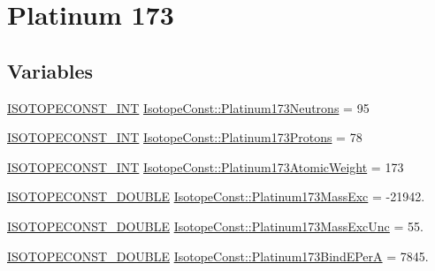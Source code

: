\hypertarget{group___isotope_const-_platinum-_pt173}{}\section{Platinum 173}
\label{group___isotope_const-_platinum-_pt173}
\subsection*{Variables}
\begin{DoxyCompactItemize}
\item 
\mbox{\hyperlink{group___isotope_const-_macros_ga5f18360b3e99483a35c32d789e62621c}{I\+S\+O\+T\+O\+P\+E\+C\+O\+N\+S\+T\+\_\+\+I\+NT}} \mbox{\hyperlink{group___isotope_const-_platinum-_pt173_ga45f5c671c96f5fbc4a76d75455da8bb3}{Isotope\+Const\+::\+Platinum173\+Neutrons}} = 95
\item 
\mbox{\hyperlink{group___isotope_const-_macros_ga5f18360b3e99483a35c32d789e62621c}{I\+S\+O\+T\+O\+P\+E\+C\+O\+N\+S\+T\+\_\+\+I\+NT}} \mbox{\hyperlink{group___isotope_const-_platinum-_pt173_ga7696fb79e86ba0a145583fd72394cceb}{Isotope\+Const\+::\+Platinum173\+Protons}} = 78
\item 
\mbox{\hyperlink{group___isotope_const-_macros_ga5f18360b3e99483a35c32d789e62621c}{I\+S\+O\+T\+O\+P\+E\+C\+O\+N\+S\+T\+\_\+\+I\+NT}} \mbox{\hyperlink{group___isotope_const-_platinum-_pt173_gaa03d9175172927e715d9537d2cde54cd}{Isotope\+Const\+::\+Platinum173\+Atomic\+Weight}} = 173
\item 
\mbox{\hyperlink{group___isotope_const-_macros_ga8f45a7272ce02c0b4c65c44636ed719a}{I\+S\+O\+T\+O\+P\+E\+C\+O\+N\+S\+T\+\_\+\+D\+O\+U\+B\+LE}} \mbox{\hyperlink{group___isotope_const-_platinum-_pt173_gad729eb1c572065421f4f3b2641da453b}{Isotope\+Const\+::\+Platinum173\+Mass\+Exc}} = -\/21942.
\item 
\mbox{\hyperlink{group___isotope_const-_macros_ga8f45a7272ce02c0b4c65c44636ed719a}{I\+S\+O\+T\+O\+P\+E\+C\+O\+N\+S\+T\+\_\+\+D\+O\+U\+B\+LE}} \mbox{\hyperlink{group___isotope_const-_platinum-_pt173_gadc6c9a7e5e1b4432fe1e44a6eb105c54}{Isotope\+Const\+::\+Platinum173\+Mass\+Exc\+Unc}} = 55.
\item 
\mbox{\hyperlink{group___isotope_const-_macros_ga8f45a7272ce02c0b4c65c44636ed719a}{I\+S\+O\+T\+O\+P\+E\+C\+O\+N\+S\+T\+\_\+\+D\+O\+U\+B\+LE}} \mbox{\hyperlink{group___isotope_const-_platinum-_pt173_gaada409562b5af7229d169cd976ec394c}{Isotope\+Const\+::\+Platinum173\+Bind\+E\+PerA}} = 7845.
\item 

\end{DoxyCompactItemize}
